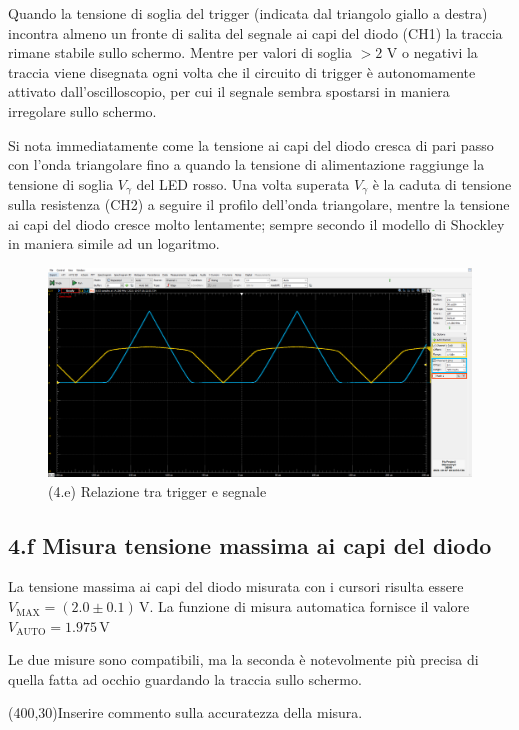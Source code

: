 \documentclass[10pt,a4paper]{article}
\begin{document}
Quando la tensione di soglia del trigger (indicata dal triangolo giallo a
destra) incontra almeno un fronte di salita del segnale ai capi del diodo 
(CH1) la traccia rimane stabile sullo schermo. Mentre per valori di soglia
$> 2$ V o negativi la traccia viene disegnata ogni volta che il circuito di
trigger è autonomamente attivato dall'oscilloscopio, per cui il segnale sembra
spostarsi in maniera irregolare sullo schermo.

Si nota immediatamente come la tensione ai capi del diodo cresca di pari
passo con l'onda triangolare fino a quando la tensione di alimentazione 
raggiunge la tensione di soglia $V_\gamma$ del LED rosso. Una volta superata
$V_\gamma$ è la caduta di tensione sulla resistenza (CH2) a seguire il profilo
dell'onda triangolare, mentre la tensione ai capi del diodo cresce molto
lentamente; sempre secondo il modello di Shockley in maniera simile ad un
logaritmo.

\begin{figure}[htb]
\centering
\includegraphics[scale=0.3]{trgdiode_new}
\caption{(4.e) Relazione tra trigger e segnale}
\end{figure}


\subsection*{4.f Misura tensione massima ai capi del diodo}

La tensione massima ai capi del diodo misurata con i cursori risulta essere
$V_{\mathrm{MAX}}= (2.0 \pm 0.1 ) \,\mathrm{V}$. La funzione di misura
automatica fornisce il valore $V_{\mathrm{AUTO}}= 1.975 \,\mathrm{V}$

Le due misure sono compatibili, ma la seconda è notevolmente più precisa di
quella fatta ad occhio guardando la traccia sullo schermo.


\framebox(400,30){Inserire commento sulla accuratezza della misura.}
\end{document}
